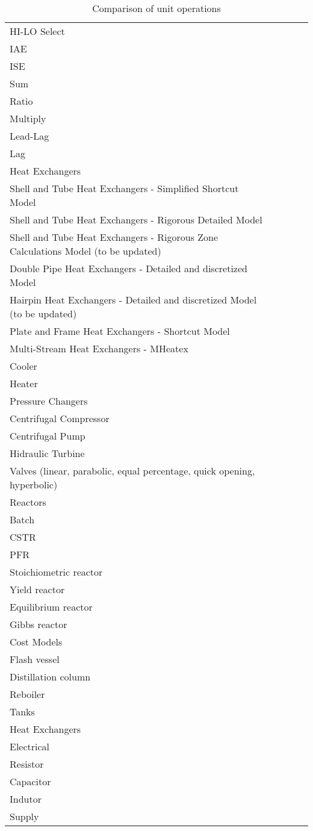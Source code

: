 \begin{table}[htbp]
\begin{tabular}{lllll}
    HI-LO Select \\
    IAE \\
    ISE \\
    Sum \\
    Ratio \\
    Multiply \\
    Lead-Lag \\
    Lag \\
    Heat Exchangers \\
    Shell and Tube Heat Exchangers - Simplified Shortcut Model \\
    Shell and Tube Heat Exchangers - Rigorous Detailed Model \\
    Shell and Tube Heat Exchangers - Rigorous Zone Calculations Model (to be updated) \\
    Double Pipe Heat Exchangers - Detailed and discretized Model \\
    Hairpin Heat Exchangers - Detailed and discretized Model (to be updated) \\
    Plate and Frame Heat Exchangers - Shortcut Model \\
    Multi-Stream Heat Exchangers - MHeatex \\
    Cooler \\
    Heater \\
    Pressure Changers \\
    Centrifugal Compressor \\
    Centrifugal Pump \\
    Hidraulic Turbine \\
    Valves (linear, parabolic, equal percentage, quick opening, hyperbolic) \\
    Reactors \\
    Batch \\
    CSTR \\
    PFR \\
    Stoichiometric reactor \\
    Yield reactor \\
    Equilibrium reactor \\
    Gibbs reactor \\
    Cost Models \\
    Flash vessel \\
    Distillation column \\
    Reboiler \\
    Tanks \\
    Heat Exchangers \\
    Electrical \\
    Resistor \\
    Capacitor \\
    Indutor \\
    Supply \\
    \bottomrule
  \end{tabular}
  \caption{Comparison of unit operations}
  \label{tab:unitopcomparison}
\end{table}

